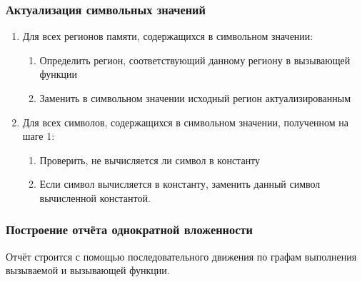 \documentclass[hyperref={pdfpagelabels=false},10pt,gray]{beamer}
\begin{document}

\begin{frame}
\frametitle{Актуализация символьных значений}

\begin{enumerate}
 \item Для всех регионов памяти, содержащихся в символьном значении:
 \begin{enumerate}
  \item Определить регион, соответствующий данному региону в вызывающей функции
  \item Заменить в символьном значении исходный регион актуализированным
 \end{enumerate}
 \item Для всех символов, содержащихся в символьном значении, полученном на шаге 1:
  \begin{enumerate}
  \item Проверить, не вычисляется ли символ в константу
  \item Если символ вычисляется в константу, заменить данный символ вычисленной константой.
 \end{enumerate}

\end{enumerate}
\end{frame}


\begin{frame}
\frametitle{Построение отчёта однократной вложенности}
Отчёт строится с помощью последовательного движения по графам выполнения вызываемой и вызывающей функции.

\begin{figure}[H]
\end{figure}
\end{frame}
\end{document}
